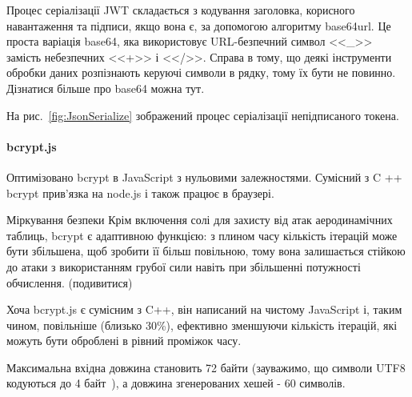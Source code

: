 Процес серіалізації JWT складається з кодування заголовка, корисного навантаження та підписи, якщо вона є, за допомогою алгоритму base64url. Це проста варіація base64, яка використовує URL-безпечний символ <<\_>> замість небезпечних <<+>> і <</>>. Справа в тому, що деякі інструменти обробки даних розпізнають керуючі символи в рядку, тому їх бути не повинно. Дізнатися більше про base64 можна тут.

На рис.~\ref{fig:JsonSerialize} зображений процес серіалізації непідписаного токена.


\paragraph{bcrypt.js}

Оптимізовано bcrypt в JavaScript з нульовими залежностями. Сумісний з C ++ bcrypt прив'язка на node.js і також працює в браузері.

Міркування безпеки
Крім включення солі для захисту від атак аеродинамічних таблиць, bcrypt є адаптивною функцією: з плином часу кількість ітерацій може бути збільшена, щоб зробити її більш повільною, тому вона залишається стійкою до атаки з використанням грубої сили навіть при збільшенні потужності обчислення. (подивитися)

Хоча bcrypt.js є сумісним з C++, він написаний на чистому JavaScript і, таким чином, повільніше (близько 30\%), ефективно зменшуючи кількість ітерацій, які можуть бути оброблені в рівний проміжок часу.

Максимальна вхідна довжина становить 72 байти (зауважимо, що символи UTF8 кодуються до 4 байт~\cite{yergeau2003utf}), а довжина згенерованих хешей - 60 символів.

